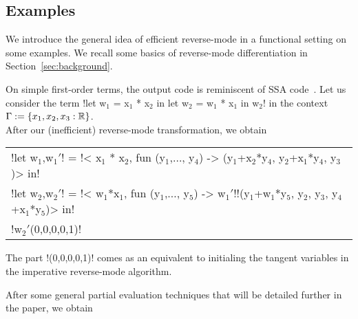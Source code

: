 \subsection{Examples}

We introduce the general idea of efficient reverse-mode in a functional setting on some examples.
We recall some basics of reverse-mode differentiation in Section~\ref{sec:background}.

\begin{example}
On simple first-order terms, the output code is reminiscent of SSA code~\cite{cytron1989efficient}.
Let us consider the term !let w$_1$ = x$_1$ * x$_2$ in let w$_2$ = w$_1$ * x$_1$ in w$_2$! in the context $\Gamma:=\{x_1,x_2, x_3:\mathbb{R}\}$.\\
After our (inefficient) reverse-mode transformation, we obtain
\begin{center}
    \begin{tabular}{l}
        !let w$_1$,w$_1'$! = !< x$_1$ * x$_2$, fun (y$_1$,$\ldots$, y$_4$) -> (y$_1$+x$_2$*y$_4$, y$_2$+x$_1$*y$_4$, y$_3$)> in!\\
        !let w$_2$,w$_2'$! = !< w$_1$*x$_1$, fun (y$_1$,$\ldots$, y$_5$) -> w$_1'$!!(y$_1$+w$_1$*y$_5$, y$_2$, y$_3$, y$_4$+x$_1$*y$_5$)> in!\\
        !w$_2'$(0,0,0,0,1)!
    \end{tabular}
\end{center}
The part !(0,0,0,0,1)! comes as an equivalent to initialing the tangent variables in the imperative reverse-mode algorithm. 

After some general partial evaluation techniques that will be detailed further in the paper, we obtain     


\end{example}
